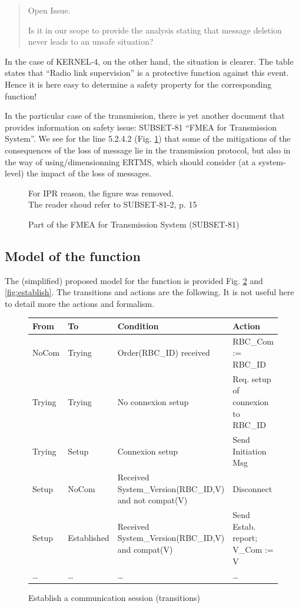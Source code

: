 \documentclass{template/openetcs_article}
\newenvironment{issue}{
	\begin{quote}
	\begin{itshape}Open Issue. 
}{
	\end{itshape}
	\end{quote}
}
\begin{document}
\begin{issue}
Is it in our scope to provide the analysis stating that message deletion never leads to 
an unsafe situation?
\end{issue}

In the case of KERNEL-4, on the other hand, the situation is clearer. The table states that 
``Radio link supervision'' is a protective function against this event. Hence it is here easy to
determine a safety property for the corresponding function!

In the particular case of the transmission, there is yet another document that provides 
information on safety issue: SUBSET-81 ``FMEA for Transmission System''. We see for the 
line 5.2.4.2 (Fig. \ref{fig:fmea}) that some of the mitigations of the consequences of the loss
of message lie in the transmission protocol, but also in the way of using/dimensionning ERTMS,
which should consider (at a system-level) the impact of the loss of messages.

\begin{figure}
  \centering
  {For IPR reason, the figure was removed. \\
  The reader shoud refer to SUBSET-81-2, p. 15}
  \caption{Part of the FMEA for Transmission System (SUBSET-81)}
  \label{fig:fmea}
\end{figure}

\subsection{Model of the function}
The (simplified) proposed model for the function is provided Fig. \ref{fig:establish_tab} and 
\ref{fig:establish}. The transitions and actions are the following. It is not useful here to detail
more the actions and formalism.

\begin{figure}
\centering
\small
\begin{tabular}{|l|l||p{3.5cm}|p{3.5cm}|}
\hline
\bf From & \bf To & \bf Condition & \bf Action \\
\hline
NoCom & Trying & Order(RBC\_ID) received & RBC\_Com := RBC\_ID \\
\hline
Trying & Trying & No connexion setup & Req. setup of connexion to RBC\_ID \\
\hline
Trying & Setup & Connexion setup & Send Initiation Msg \\
\hline
Setup & NoCom & Received System\_Version(RBC\_ID,V) and not compat(V)  & Disconnect\\
\hline
Setup & Established & Received System\_Version(RBC\_ID,V) and compat(V) & 
		Send Estab. report; V\_Com := V  \\
\hline
\dots & \dots & \dots & \dots  \\
\hline
\end{tabular}
\normalsize
\caption{Establish a communication session (transitions)}
\label{fig:establish_tab}
\end{figure}
\end{document}
